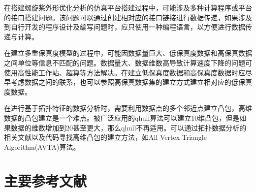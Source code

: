 在搭建螺旋桨外形优化分析的仿真平台搭建过程中，可能涉及多种计算程序或平台的接口搭建问题。该问题可以通过创建相对应的接口链接进行数据传递，如果涉及到自行开发的程序设计及编写问题时，应只使用一种编程语言，以方便进行数据传递与计算。

在建立多重保真度模型的过程中，可能因数据量巨大、低保真度数据和高保真数据之间单位等信息不匹配的问题。数据量大、数据维数高导致计算速度下降的问题可使用高性能工作站、超算等方法解决。在建立低保真度数据和高保真度数据时应尽早考虑数据之间的联系，也可以参照高保真数据集的建立方式建立相对应的低保真度数据。

在进行基于拓扑特征的数据分析时，需要利用数据点的多个邻近点建立凸包，高维数据的凸包建立是一个难点。被广泛应用的qhull算法可以建立10维凸包，但是如果数据的维数增加到20甚至更大，那么qhull不再适用。可以通过拓扑数据分析的相关文献以及代码寻找高维凸包的建立方法，如All Vertex Triangle Algorithm(AVTA)算法\cite{Awasthi2020}。


\vspace{0.8em}
\section{主要参考文献}\label{Sec: reference}
\vspace{0.8em}




